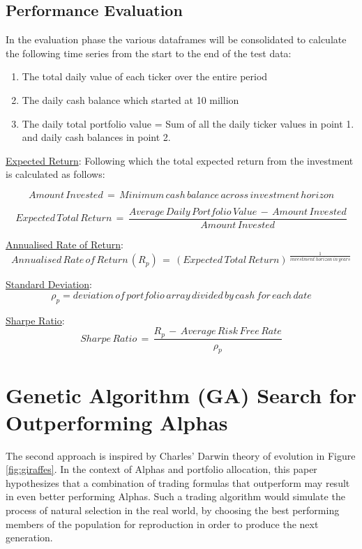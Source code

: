 \documentclass[a4paper,12pt]{report}
\numberwithin{equation}{section}
\theoremstyle{definition}
\begin{document}
\subsection{Performance Evaluation}
In the evaluation phase the various dataframes will be consolidated to calculate the following time series from the start to the end of the test data:
\begin{enumerate}
  \item {The total daily value of each ticker over the entire period}
  \item {The daily cash balance which started at 10 million}
  \item {The daily total portfolio value = Sum of all the daily ticker values in point 1. and daily cash balances in point 2.}
\end{enumerate}

\underline{Expected Return}:
Following which the total expected return from the investment is calculated as follows:

\begin{equation*}
  Amount\,Invested\,=\,Minimum\,cash\,balance\,across\,investment\,horizon 
\end{equation*}  

\begin{equation*}
  Expected\,Total\,Return\,=\,\frac{Average\,Daily\,Portfolio\,Value\,-\,Amount\,Invested}{Amount\,Invested}
\end{equation*}

\underline{Annualised Rate of Return}:
\begin{equation*}
  Annualised\,Rate\,of\,Return\,(R_p)\,=\,(Expected\,Total\,Return)\,^{\frac{1}{investment\,horizon\,in\,years}}
\end{equation*}  


\underline{Standard Deviation}:
\begin{equation*}
  \rho_p = deviation\,of\,portfolio\,array\,divided\,by\,cash\,for\,each\,date
\end{equation*}  

\underline{Sharpe Ratio}:
\begin{equation*}
  Sharpe\,Ratio\,=\,\frac{R_p\,-\,Average\,Risk\,Free\,Rate}{\rho_p}
\end{equation*}  



\section{Genetic Algorithm (GA) Search for Outperforming Alphas}
The second approach is inspired by Charles' Darwin theory of evolution in Figure \ref{fig:giraffes}. In the context of Alphas and portfolio allocation, this paper hypothesizes that a combination of trading formulas that outperform may result in even better performing Alphas.  Such a trading algorithm would  simulate the process of natural selection in the real world, by choosing the best performing members of the population for reproduction in order to produce the next generation.
\end{document}
